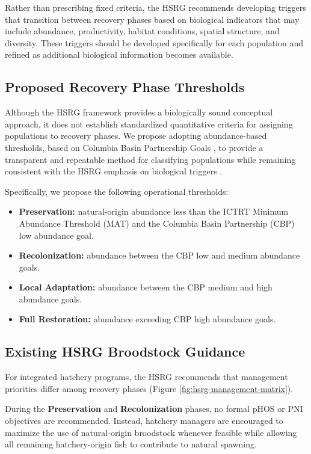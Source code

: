 \documentclass[12pt,letterpaper]{article}
\providecommand{\tightlist}{%
  \setlength{\itemsep}{0pt}\setlength{\parskip}{0pt}}
\begin{document}
Rather than prescribing fixed criteria, the HSRG recommends developing triggers that transition between recovery phases based on biological indicators that may include abundance, productivity, habitat conditions, spatial structure, and diversity. These triggers should be developed specifically for each population and refined as additional biological information becomes available.

\subsection{Proposed Recovery Phase Thresholds}\label{proposed-recovery-phase-thresholds}

Although the HSRG framework provides a biologically sound conceptual approach, it does not establish standardized quantitative criteria for assigning populations to recovery phases. We propose adopting abundance-based thresholds, based on Columbia Basin Partnership Goals \autocite{cbp_vision_2020}, to provide a transparent and repeatable method for classifying populations while remaining consistent with the HSRG emphasis on biological triggers \autocite{hsrg_developing_2020}.

Specifically, we propose the following operational thresholds:

\begin{itemize}
\tightlist
\item
  \textbf{Preservation:} natural-origin abundance less than the ICTRT Minimum Abundance Threshold (MAT) and the Columbia Basin Partnership (CBP) low abundance goal.
\item
  \textbf{Recolonization:} abundance between the CBP low and medium abundance goals.
\item
  \textbf{Local Adaptation:} abundance between the CBP medium and high abundance goals.
\item
  \textbf{Full Restoration:} abundance exceeding CBP high abundance goals.
\end{itemize}

\subsection{Existing HSRG Broodstock Guidance}\label{existing-hsrg-broodstock-guidance}

For integrated hatchery programs, the HSRG recommends that management priorities differ among recovery phases (Figure \ref{fig:hsrg-management-matrix}).

During the \textbf{Preservation} and \textbf{Recolonization} phases, no formal pHOS or PNI objectives are recommended. Instead, hatchery managers are encouraged to maximize the use of natural-origin broodstock whenever feasible while allowing all remaining hatchery-origin fish to contribute to natural spawning.
\end{document}
